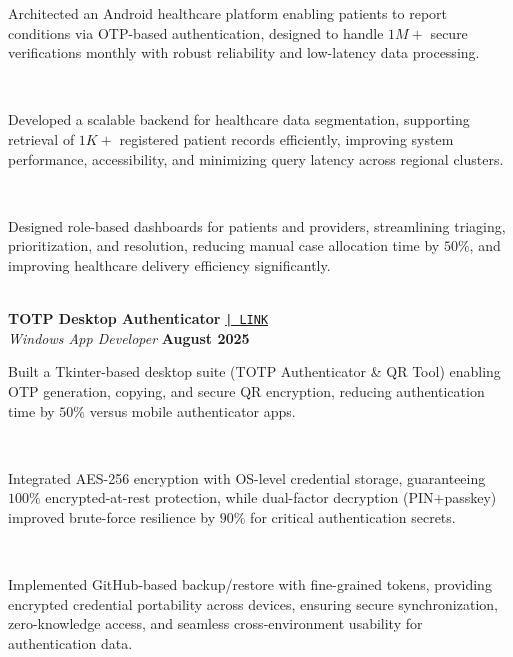 \documentclass[a4paper,10pt]{article}
\begin{document}
\noindent\makebox[1.5em][l]{--}%
\parbox[t]{\dimexpr\linewidth-1.5em\relax}{%
Architected an Android healthcare platform enabling patients to report conditions via OTP-based authentication, designed to handle $1M+$ secure verifications monthly with robust reliability and low-latency data processing.} \\[0pt]

\noindent\makebox[1.5em][l]{--}%
\parbox[t]{\dimexpr\linewidth-1.5em\relax}{%
Developed a scalable backend for healthcare data segmentation, supporting retrieval of $1K+$ registered patient records efficiently, improving system performance, accessibility, and minimizing query latency across regional clusters.} \\[0pt]

\noindent\makebox[1.5em][l]{--}%
\parbox[t]{\dimexpr\linewidth-1.5em\relax}{%
Designed role-based dashboards for patients and providers, streamlining triaging, prioritization, and resolution, reducing manual case allocation time by $50\%$, and improving healthcare delivery efficiency significantly.} \\[4pt]



\noindent
\textbf{TOTP Desktop Authenticator}
\href{https://github.com/ppriyanshu26/AuthPublic}{\texttt{| LINK}} \\
\textit{Windows App Developer} \hfill \textbf{August 2025} \\[-8pt]

\noindent\makebox[1.5em][l]{--}%
\parbox[t]{\dimexpr\linewidth-1.5em\relax}{%
Built a Tkinter-based desktop suite (TOTP Authenticator \& QR Tool) enabling OTP generation, copying, and secure QR encryption, reducing authentication time by $50\%$ versus mobile authenticator apps.} \\[0pt]

\noindent\makebox[1.5em][l]{--}%
\parbox[t]{\dimexpr\linewidth-1.5em\relax}{%
Integrated AES-256 encryption with OS-level credential storage, guaranteeing $100\%$ encrypted-at-rest protection, while dual-factor decryption (PIN+passkey) improved brute-force resilience by $90\%$ for critical authentication secrets.} \\[0pt]

\noindent\makebox[1.5em][l]{--}%
\parbox[t]{\dimexpr\linewidth-1.5em\relax}{%
Implemented GitHub-based backup/restore with fine-grained tokens, providing encrypted credential portability across devices, ensuring secure synchronization, zero-knowledge access, and seamless cross-environment usability for authentication data.} \\[4pt]
\end{document}
